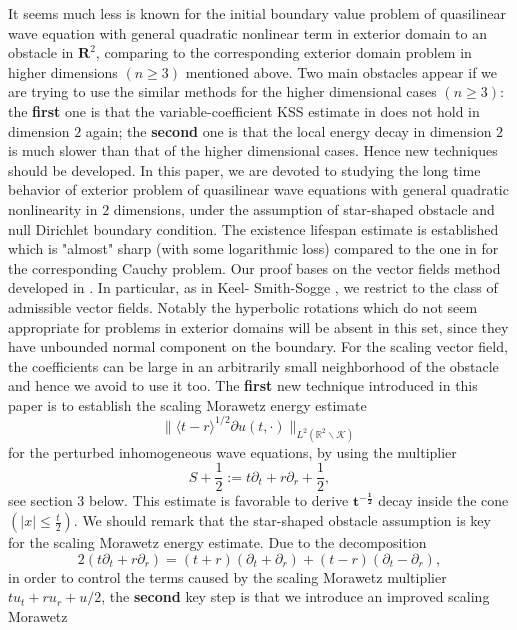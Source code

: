 \documentclass[11pt, reqno]{amsart}
\theoremstyle{definition}
\theoremstyle{remark}
\theoremstyle{definition}
\numberwithin{equation}{section}
\newcommand{\R}{\mathbf{R}}
\numberwithin{equation}{section}
\begin{document}
\par It seems much less is known for the initial boundary value problem of quasilinear wave equation with general quadratic nonlinear term in exterior domain 
to an obstacle in $\R^2$, comparing to the corresponding exterior domain problem in higher dimensions $(n\ge 3)$ mentioned above.
Two main obstacles appear if we are trying to use the similar methods for the higher dimensional cases $(n\ge 3)$: the \textbf{first} one is that the 
variable-coefficient KSS estimate in \cite{Metcalfe5} does not hold in dimension $2$ again; the \textbf{second} one is that the local energy decay in dimension 
$2$ is much slower than that of the higher dimensional cases. Hence new techniques should be developed. In this paper, we are devoted to studying the long time 
behavior of exterior problem of quasilinear wave equations with general quadratic nonlinearity in $2$ dimensions, under the assumption of star-shaped obstacle 
and null Dirichlet boundary condition. The existence lifespan estimate is established which is "almost" sharp (with some logarithmic loss) compared to the one 
in \cite{Hor85,LiY89} for the corresponding Cauchy problem. Our proof bases on the
vector fields method developed in \cite{Klainerman1}. In particular, as in Keel-
Smith-Sogge \cite{Keel2}, we restrict to the class of admissible
vector fields. Notably the hyperbolic rotations which do not seem appropriate for
problems in exterior domains will be absent in this set,
since they have unbounded normal component
on the boundary. For the scaling vector field, the coefficients can
be large in an arbitrarily small neighborhood of the obstacle and hence we avoid to use it too. The \textbf{first} new technique introduced in this paper is to 
establish the
scaling Morawetz energy estimate
\[\|\langle t-r\rangle^{1/2}\partial
u(t,\cdot)\|_{L^2(\mathbb R^2\backslash\mathcal {K})}
\]
for the
perturbed inhomogeneous wave equations, by using the multiplier
\begin{equation*}
S+\frac12:= t\partial_t+r\partial_r+\frac12,
\end{equation*}
see section 3 below. This estimate is favorable to derive $\mathbf{t^{-\frac12}}$ decay inside the cone $\left(|x|\le \frac t2\right)$. We should remark that 
the star-shaped obstacle assumption is key for the scaling Morawetz energy estimate.
Due to the
decomposition
\[
2(t\partial_t+r\partial_r)=(t+r)(\partial_t+\partial_r)
+(t-r)(\partial_t-\partial_r),
\]
in order to control the terms caused by the scaling Morawetz multiplier
$tu_t+ru_r+u/2$, the \textbf{second} key step is that we introduce an improved scaling Morawetz
\end{document}
